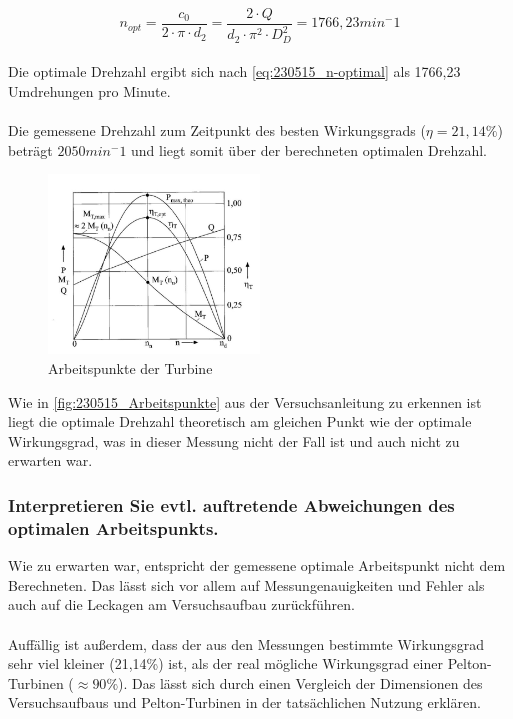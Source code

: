 \begin{equation}
 n_{opt}=\frac{c_{0}}{2 \cdot \pi \cdot d_{2}}=\frac{2 \cdot Q}{d_{2} \cdot \pi^2  \cdot D_{D}^2}=1766,23  min^-1
\label{eq:230515_n-optimal}
\end{equation}\\
 Die optimale Drehzahl ergibt sich nach \autoref{eq:230515_n-optimal} als 1766,23 Umdrehungen pro Minute.
\\\\
Die gemessene Drehzahl zum Zeitpunkt des besten Wirkungsgrads ($\eta=21,14\%$) beträgt $2050 min^-1$ und liegt somit über der berechneten optimalen Drehzahl. 

\begin{figure}[!ht]
		\centering
		\includegraphics[width=0.5\textwidth]{Abbildungen/Arbeitspunkte}
		\caption{Arbeitspunkte der Turbine}
		\label{fig:230515_Arbeitspunkte}
\end{figure}

Wie in \autoref{fig:230515_Arbeitspunkte} aus der Versuchsanleitung zu erkennen ist liegt die optimale Drehzahl theoretisch am gleichen Punkt wie der optimale Wirkungsgrad, was in dieser Messung nicht der Fall ist und auch nicht zu erwarten war.


\subsubsection{Interpretieren Sie evtl. auftretende Abweichungen des optimalen Arbeitspunkts.}

Wie zu erwarten war, entspricht der gemessene optimale Arbeitspunkt nicht dem Berechneten. Das lässt sich vor allem auf Messungenauigkeiten und Fehler als auch auf die Leckagen am Versuchsaufbau zurückführen. \\\\ Auffällig ist außerdem, dass der aus den Messungen bestimmte Wirkungsgrad sehr viel kleiner (21,14\%) ist, als der real mögliche Wirkungsgrad einer Pelton-Turbinen ($\approx90\%$). Das lässt sich durch einen Vergleich der Dimensionen des Versuchsaufbaus und Pelton-Turbinen in der tatsächlichen Nutzung erklären.


